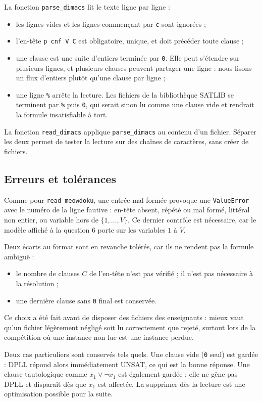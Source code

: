 \documentclass[11pt,a4paper]{article}
\begin{document}
La fonction \texttt{parse\_dimacs} lit le texte ligne par ligne :
\begin{itemize}
  \item les lignes vides et les lignes commençant par \texttt{c} sont ignorées ;
  \item l'en-tête \texttt{p cnf V C} est obligatoire, unique, et doit
    précéder toute clause ;
  \item une clause est une suite d'entiers terminée par \texttt{0}. Elle peut
    s'étendre sur plusieurs lignes, et plusieurs clauses peuvent partager
    une ligne : nous lisons un flux d'entiers plutôt qu'une clause par ligne ;
  \item une ligne \texttt{\%} arrête la lecture. Les fichiers de la
    bibliothèque SATLIB se terminent par \texttt{\%} puis \texttt{0}, qui
    serait sinon lu comme une clause vide et rendrait la formule
    insatisfiable à tort.
\end{itemize}
La fonction \texttt{read\_dimacs} applique \texttt{parse\_dimacs} au contenu
d'un fichier. Séparer les deux permet de tester la lecture sur des chaînes
de caractères, sans créer de fichiers.

\subsection{Erreurs et tolérances}

Comme pour \texttt{read\_meowdoku}, une entrée mal formée provoque une
\texttt{ValueError} avec le numéro de la ligne fautive : en-tête absent,
répété ou mal formé, littéral non entier, ou variable hors de
$\{1,\ldots,V\}$. Ce dernier contrôle est nécessaire, car le modèle affiché
à la question 6 porte sur les variables $1$ à $V$.

Deux écarts au format sont en revanche tolérés, car ils ne rendent pas la
formule ambiguë :
\begin{itemize}
  \item le nombre de clauses $C$ de l'en-tête n'est pas vérifié ; il n'est
    pas nécessaire à la résolution ;
  \item une dernière clause sans \texttt{0} final est conservée.
\end{itemize}
Ce choix a été fait avant de disposer des fichiers des enseignants : mieux
vaut qu'un fichier légèrement négligé soit lu correctement que rejeté, surtout
lors de la compétition où une instance non lue est une instance perdue.

Deux cas particuliers sont conservés tels quels. Une clause vide
(\texttt{0} seul) est gardée : DPLL répond alors immédiatement UNSAT, ce qui
est la bonne réponse. Une clause tautologique comme $x_1\lor\neg x_1$ est
également gardée : elle ne gêne pas DPLL et disparaît dès que $x_1$ est
affectée. La supprimer dès la lecture est une optimisation possible pour la
suite.
\end{document}
